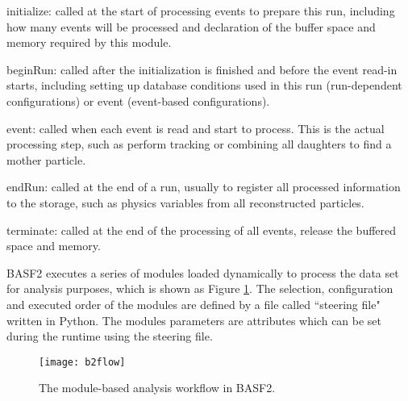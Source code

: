 \textbullet \space initialize: called at the start of processing events to prepare this run, including how many events will be processed and declaration of the buffer space and memory required by this module.

\textbullet \space beginRun: called after the initialization is finished and before the event read-in starts, including setting up database conditions used in this run (run-dependent configurations) or event (event-based configurations).

\textbullet \space event: called when each event is read and start to process. This is the actual processing step, such as perform tracking or combining all daughters to find a mother particle. 

\textbullet \space endRun: called at the end of a run, usually to register all processed information to the storage, such as physics variables from all reconstructed particles.

\textbullet \space terminate: called at the end of the processing of all events, release the buffered space and memory.

BASF2 executes a series of modules loaded dynamically to process the data set for analysis purposes, which is shown as Figure \ref{fig:b2flow}. The selection, configuration and executed order of the modules are defined by a file called ``steering file" written in Python. The modules parameters are attributes which can be set during the runtime using the steering file. 
\begin{comment}
For example, the ``Path" object declared in a steering file stores the sequence of modules that will be executed, to which allow other modules such as ``mdstInput" or ``reconstructDecay" to be added.
Users can use ``boolean" type variable set in ``event" function to create a conditional branch of a ``Path" in case that one event needs to be processed with different modules at the same time. For instance, in the decay reconstruction package, if a decay chain is not fulfilled by missing one particle in the ``event" functions, other back-up decay chains can be checked to see if a successful reconstruction is possible.  
\end{comment}


\begin{figure}[htpb]
	\centering
	\texttt{[image: b2flow]}
	\caption{The module-based analysis workflow in BASF2.}
	\label{fig:b2flow}
\end{figure}

